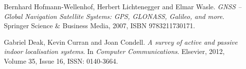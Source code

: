 \begin{thebibliography}{10}

Bernhard Hofmann-Wellenhof, Herbert Lichtenegger and Elmar Wasle. \textit{GNSS – Global Navigation Satellite Systems: GPS, GLONASS, Galileo, and more}. Springer Science \& Business Media, 2007, ISBN 9783211730171.

Gabriel Deak, Kevin Curran and Joan Condell. \textit{A survey of active and passive indoor localisation systems}. In \textit{Computer Communications}. Elsevier, 2012, Volume 35, Issue 16, ISSN: 0140-3664.

\end{thebibliography}